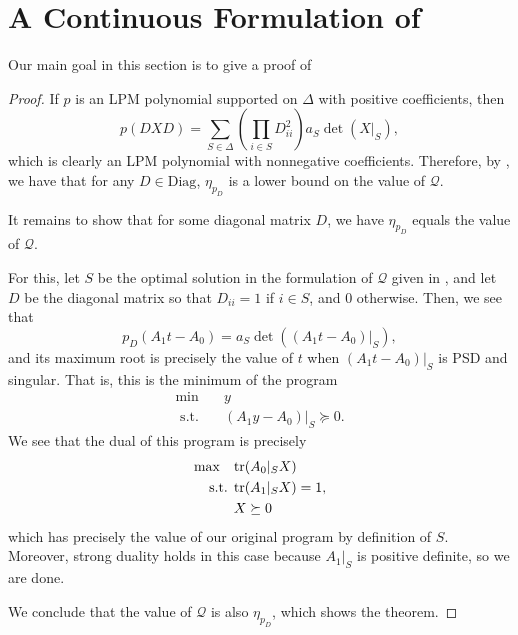 \documentclass{amsart}
\theoremstyle{definition}
\newcommand{\tr}{\textup{tr}}
\newcommand{\st}{{\text{ s.t. }}}
\begin{document}
\section{A Continuous Formulation of }
\label{sec:continuous}
Our main goal in this section is to give a proof of 
\begin{proof}%
    If $p$ is an LPM polynomial supported on $\Delta$ with positive coefficients, then
    \[
        p(DXD) = \sum_{S \in \Delta} \left(\prod_{i \in S} D_{ii}^2\right) a_S \det(X|_S),
    \]
    which is clearly an LPM polynomial with nonnegative coefficients.
    Therefore, by , we have that for any $D \in \text{Diag}$, $\eta_{p_D}$ is a lower bound on the value of $\mathcal{Q}$.

    It remains to show that for some diagonal matrix $D$, we have $\eta_{p_D}$ equals the value of $\mathcal{Q}$.

    For this, let $S$ be the optimal solution in the formulation of $\mathcal{Q}$ given in , and let $D$ be the diagonal matrix so that $D_{ii} = 1$ if $i \in S$, and $0$ otherwise.
    Then, we see that
    \[
        p_D(A_1 t - A_0) = a_S\det((A_1t - A_0)|_S),
    \]
    and its maximum root is precisely the value of $t$ when $(A_1t - A_0)|_S$ is PSD and singular.
    That is, this is the minimum of the program
    \begin{equation}
        \begin{aligned}
            \min\quad & y\\
            \st & (A_1y - A_0)|_S \succeq 0.
        \end{aligned}
    \end{equation}
    We see that the dual of this program is precisely
    \begin{equation}
        \begin{aligned}
            \max\quad & \tr(A_0|_SX)\\
            \st & \tr(A_1|_SX) = 1\\
                & X \succeq 0\\
        \end{aligned},
    \end{equation}
    which has precisely the value of our original program by definition of $S$.
    Moreover, strong duality holds in this case because $A_1|_S$ is positive definite, so we are done.

    We conclude that the value of $\mathcal{Q}$ is also $\eta_{p_D}$, which shows the theorem.
\end{proof}
\end{document}
